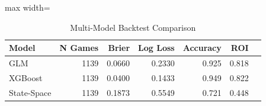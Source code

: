 \begin{table}[htbp]
\centering
\caption{Multi-Model Backtest Comparison}
\label{tab:multimodel}
\begin{adjustbox}{max width=\textwidth}
\begin{tabular}{lrrrrrr}
\toprule
 \textbf{Model} & \textbf{N Games} & \textbf{Brier} & \textbf{Log Loss} & \textbf{Accuracy} & \textbf{ROI} \\
\midrule
GLM & 1139 & 0.0660 & 0.2330 & 0.925 & 0.818 \\
XGBoost & 1139 & 0.0400 & 0.1433 & 0.949 & 0.822 \\
State-Space & 1139 & 0.1873 & 0.5549 & 0.721 & 0.448 \\
\bottomrule
\end{tabular}
\end{adjustbox}
\end{table}
